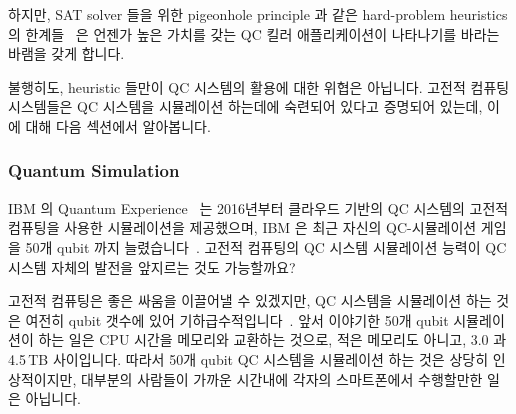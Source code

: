 하지만, SAT solver 들을 위한 pigeonhole principle 과 같은 hard-problem
heuristics 의 한계들~\cite[page~38]{Kroening:2008:DPA:1391237} 은 언젠가 높은
가치를 갖는 QC 킬러 애플리케이션이 나타나기를 바라는 바램을 갖게 합니다.

불행히도, heuristic 들만이 QC 시스템의 활용에 대한 위협은 아닙니다.
고전적 컴퓨팅 시스템들은 QC 시스템을 시뮬레이션 하는데에 숙련되어 있다고
증명되어 있는데, 이에 대해 다음 섹션에서 알아봅니다.

\subsubsection{Quantum Simulation}
\label{sec:future:Quantum Simulation}

IBM 의 Quantum Experience~\cite{IBM2016QuantumExperience} 는 2016년부터
클라우드 기반의 QC 시스템의 고전적 컴퓨팅을 사용한 시뮬레이션을 제공했으며, IBM
은 최근 자신의 QC-시뮬레이션 게임을 50개 qubit 까지
늘렸습니다~\cite{WillKnight2017IBM50qubitSim}.
고전적 컴퓨팅의 QC 시스템 시뮬레이션 능력이 QC 시스템 자체의 발전을 앞지르는
것도 가능할까요?

고전적 컴퓨팅은 좋은 싸움을 이끌어낼 수 있겠지만, QC 시스템을 시뮬레이션 하는
것은 여전히 qubit 갯수에 있어
기하급수적입니다~\cite{ScottAaronson2017IBM50qubitSim}.
앞서 이야기한 50개 qubit 시뮬레이션이 하는 일은 CPU 시간을 메모리와 교환하는
것으로, 적은 메모리도 아니고, 3.0 과 4.5\,TB 사이입니다.
따라서 50개 qubit QC 시스템을 시뮬레이션 하는 것은 상당히 인상적이지만,
대부분의 사람들이 가까운 시간내에 각자의 스마트폰에서 수행할만한 일은 아닙니다.

